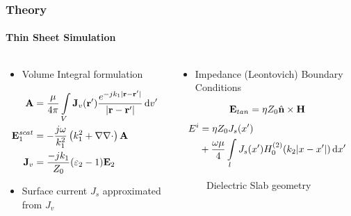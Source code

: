 \documentclass[mathserif,18pt,xcolor=table]{beamer}
\begin{document}
\begin{frame}
\frametitle{Theory}
\framesubtitle{Thin Sheet Simulation}
\begin{columns}[T] %
\begin{column}{.5\textwidth}
  \begin{itemize}
    \item{Volume Integral formulation}
  \end{itemize}
  \begin{equation} \nonumber
    \begin{split}
      \mathbf{A} &= \frac{\mu}{4 \pi} \int\limits_{V} \mathbf{J}_v(\mathbf{r}')  \frac{ e^{-j k_1 |\mathbf{r} - \mathbf{r}'|}}{|\mathbf{r} - \mathbf{r}'|} \mathop{}\!\mathrm{d}{v'} \\
      \mathbf{E}_1^{scat} &= -\frac{j \omega}{k_1^2} \left( k_1^2 + \nabla \nabla \cdot \right) \mathbf{A} \\
      \mathbf{J}_v &= \frac{-j k_1}{Z_0}(\varepsilon_2 - 1)\mathbf{E}_2
    \end{split}
    \label{eq:E1sc}
  \end{equation}
  \begin{itemize}
    \item{Surface current $J_s$ approximated from $J_v$}
  \end{itemize}
\end{column}
\begin{column}[T]{.5\textwidth}
  \vspace*{-2cm}
  \begin{itemize}
    \item{Impedance (Leontovich) Boundary Conditions}
  \end{itemize}
  \begin{equation} \nonumber
    \mathbf{E}_{tan} = \eta Z_0 \hat{\mathbf{n}} \times \mathbf{H}
    \label{eq:eps}
  \end{equation}
  \begin{equation} \nonumber
    \begin{split}
      E^i &= \eta Z_0 J_s(x') \\
      & + \frac{\omega \mu}{4}  \int\limits_{l} J_s(x')  H_0^{(2)}(k_2 |x - x'|) \mathop{}\!\mathrm{d}{x'}
    \end{split}
    \label{eq:eps}
  \end{equation}
  \begin{figure}
    \def\svgwidth{.75\linewidth}
    
    \caption{Dielectric Slab geometry}
  \end{figure}
  \end{column}%
\end{columns}
\end{frame}
\end{document}
